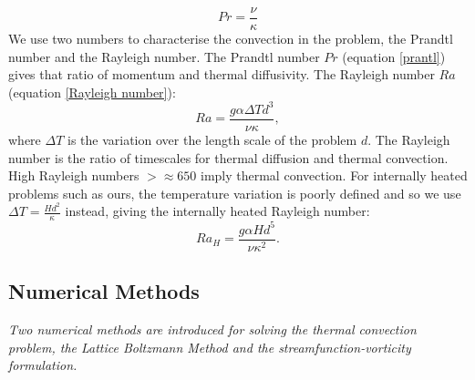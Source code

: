 \documentclass{article}
\begin{document}
\begin{equation}
	Pr = \frac{\nu}{\kappa}
	\label{prantl}
\end{equation}
We use two numbers to characterise the convection in the problem, the Prandtl number and the Rayleigh number. The Prandtl number $Pr$ (equation \ref{prantl}) gives that ratio of momentum and thermal diffusivity. The Rayleigh number $Ra$ (equation \ref{Rayleigh number}):
\begin{equation}
	Ra = \frac{g \alpha \Delta T  d^3}{\nu \kappa},
\end{equation}
where $\Delta T$ is the variation over the length scale of the problem $d$. The Rayleigh number is the ratio of timescales for thermal diffusion and thermal convection. High Rayleigh numbers $>\approx 650$ imply thermal convection. For internally heated problems such as ours, the temperature variation is poorly defined and so we use $\Delta T = \frac{H d^2}{\kappa}$ instead, giving the internally heated Rayleigh number:
\begin{equation}
	Ra_{H} = \frac{g \alpha H d^5}{\nu {\kappa}^2}.
\end{equation}


\subsection*{Numerical Methods}

{\it{Two numerical methods are introduced for solving the thermal convection problem, the Lattice Boltzmann Method and the streamfunction-vorticity formulation. }}
\end{document}
